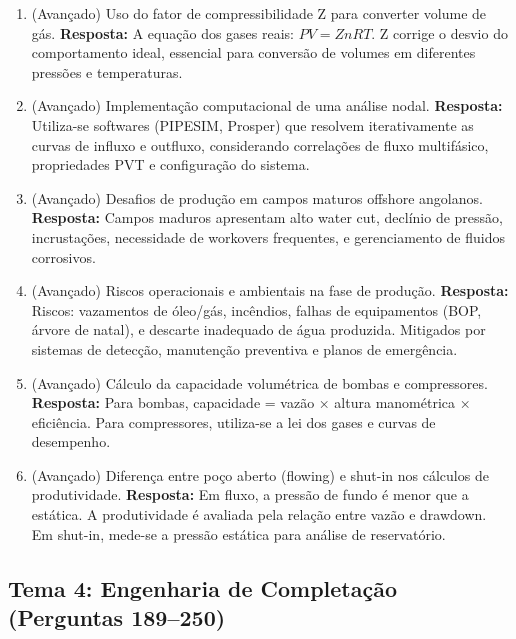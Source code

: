 \documentclass[11pt,a4paper]{article}
\begin{document}
\begin{enumerate}
  \item (Avançado) Uso do fator de compressibilidade Z para converter volume de gás.
  \textbf{Resposta:} A equação dos gases reais: $PV = ZnRT$. Z corrige o desvio do comportamento ideal, essencial para conversão de volumes em diferentes pressões e temperaturas.

  \item (Avançado) Implementação computacional de uma análise nodal.
  \textbf{Resposta:} Utiliza-se softwares (PIPESIM, Prosper) que resolvem iterativamente as curvas de influxo e outfluxo, considerando correlações de fluxo multifásico, propriedades PVT e configuração do sistema.

  \item (Avançado) Desafios de produção em campos maturos offshore angolanos.
  \textbf{Resposta:} Campos maduros apresentam alto water cut, declínio de pressão, incrustações, necessidade de workovers frequentes, e gerenciamento de fluidos corrosivos.

  \item (Avançado) Riscos operacionais e ambientais na fase de produção.
  \textbf{Resposta:} Riscos: vazamentos de óleo/gás, incêndios, falhas de equipamentos (BOP, árvore de natal), e descarte inadequado de água produzida. Mitigados por sistemas de detecção, manutenção preventiva e planos de emergência.

  \item (Avançado) Cálculo da capacidade volumétrica de bombas e compressores.
  \textbf{Resposta:} Para bombas, capacidade = vazão × altura manométrica × eficiência. Para compressores, utiliza-se a lei dos gases e curvas de desempenho.

  \item (Avançado) Diferença entre poço aberto (flowing) e shut-in nos cálculos de produtividade.
  \textbf{Resposta:} Em fluxo, a pressão de fundo é menor que a estática. A produtividade é avaliada pela relação entre vazão e drawdown. Em shut-in, mede-se a pressão estática para análise de reservatório.
\end{enumerate}

\newpage

\subsection*{Tema 4: Engenharia de Completação (Perguntas 189–250)}
\end{document}
